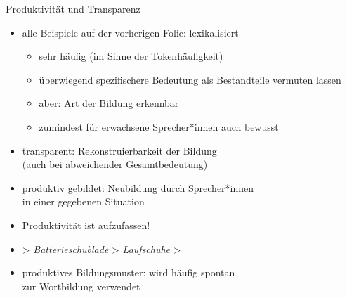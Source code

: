 \begin{frame}
  {Produktivität und Transparenz}
  \pause
  \begin{itemize}[<+->]
    \item \alert{alle} Beispiele auf der vorherigen Folie: \alert{lexikalisiert}
      \begin{itemize}[<+->]
        \item sehr häufig (im Sinne der Tokenhäufigkeit)
        \item überwiegend spezifischere Bedeutung als Bestandteile vermuten lassen
        \item aber: Art der Bildung erkennbar
        \item zumindest für erwachsene Sprecher*innen auch bewusst
      \end{itemize}
      \Halbzeile
    \item \alert{transparent}: Rekonstruierbarkeit der Bildung\\
      (auch bei abweichender Gesamtbedeutung)
      \Halbzeile
    \item \alert{produktiv gebildet}: Neubildung durch Sprecher*innen\\
      in einer gegebenen Situation
    \item Produktivität ist  aufzufassen!
    \item {} > \textit{Batterieschublade} > \textit{Laufschuhe} > 
      \Halbzeile
    \item \alert{produktives Bildungsmuster}: wird häufig spontan\\
      zur Wortbildung verwendet
  \end{itemize}
\end{frame}

